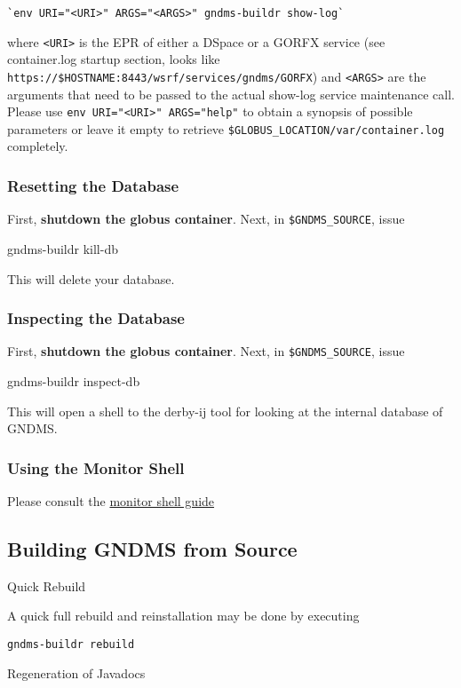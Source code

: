 \documentclass{article}
\begin{document}
\begin{verbatim}
`env URI="<URI>" ARGS="<ARGS>" gndms-buildr show-log`
\end{verbatim}
where \verb!<URI>! is the EPR of either a DSpace or a GORFX service
(see container.log startup section, looks like
\verb!https://$HOSTNAME:8443/wsrf/services/gndms/GORFX!) and
\verb!<ARGS>! are the arguments that need to be passed to the
actual show-log service maintenance call. Please use
\verb!env URI="<URI>" ARGS="help"! to obtain a synopsis of possible
parameters or leave it empty to retrieve
\verb!$GLOBUS_LOCATION/var/container.log! completely.

\subsubsection{Resetting the Database}

First, \textbf{shutdown the globus container}. Next, in
\verb!$GNDMS_SOURCE!, issue

gndms-buildr kill-db

This will delete your database.

\subsubsection{Inspecting the Database}

First, \textbf{shutdown the globus container}. Next, in
\verb!$GNDMS_SOURCE!, issue

gndms-buildr inspect-db

This will open a shell to the derby-ij tool for looking at the
internal database of GNDMS.

\subsubsection{Using the Monitor Shell}

Please consult the \href{/moni-guide}{monitor shell guide}

\subsection{Building GNDMS from Source}

Quick Rebuild

A quick full rebuild and reinstallation may be done by executing

\begin{verbatim}
gndms-buildr rebuild
\end{verbatim}
Regeneration of Javadocs
\end{document}

